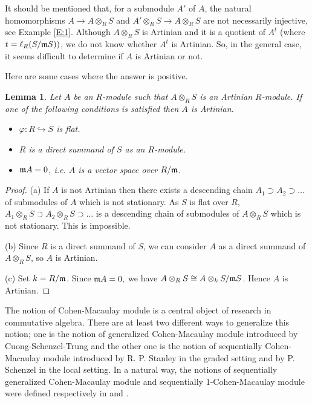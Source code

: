 \documentclass[a4papersize]{article}
\newtheorem{lemma}[theorem]{Lemma}
\begin{document}
{It should be mentioned that,  for a submodule $A'$ of $A$,  the natural homomorphisms $A\to A\otimes_RS$ and $A'\otimes_RS\to A\otimes_RS$ are not necessarily injective, see  Example \ref{E:1}. Although $A\otimes_RS$ is Artinian and it is a quotient of $A^t$ (where $t=\ell_R(S/\frak  mS))$, we do not know whether $A^t$ is Artinian. So, in the general case,  it seems difficult to determine if $A$ is Artinian or not.
 
 Here are some cases where the answer is positive. 
 
 \begin{lemma} \label{L:5} Let $A$ be an $R$-module such that $A\otimes_RS$ is an Artinian $R$-module. If one of the following conditions is satisfied then $A$ is Artinian.
 \begin{itemize}
 \item [{\rm (a)}]	$\varphi: R\hookrightarrow S$ is flat. 
 	
 \item [{\rm (b)}]   $R$ is a direct summand of $S$ as an $R$-module.
 	
 \item [{\rm (c)}]  $\frak mA=0$, i.e. $A$ is a vector space over $R/\frak m$. 
 \end{itemize}
 \end{lemma}

\begin{proof} (a) If $A$ is not Artinian then there exists a descending chain $A_1\supset A_2\supset \ldots $ of submodules of $A$ which is not stationary. As $S$ is flat over $R$, $A_1\otimes_RS\supset A_2\otimes_RS\supset \ldots $ is a descending chain of submodules of $A\otimes_RS$ which is not stationary. This is impossible.
 		
(b)  Since $R$ is a direct summand of $S$, we can consider $A$ as a direct summand of $A\otimes_RS$, so $A$ is Artinian.
 		
(c) Set $k=R/\frak m$. Since $\frak mA=0,$ we have $A\otimes_RS\cong A\otimes_kS/\frak mS$.  Hence $A$ is Artinian.
 \end{proof}
 	
 	
 The notion of Cohen-Macaulay module is a central object of research in commutative algebra.  There are at least two different ways to generalize this notion; one is the notion of generalized Cohen-Macaulay module introduced by Cuong-Schenzel-Trung \cite{CST} and the other one is the notion of sequentially Cohen-Macaulay module  introduced by  R. P. Stanley \cite{St} in the graded setting  and by P. Schenzel \cite{Sch} in the local setting. In a natural way, the notions of sequentially generalized Cohen-Macaulay module and  sequentially $1$-Cohen-Macaulay module were defined respectively in \cite{CN} and \cite{LLN}. 
 	
}
\end{document}
